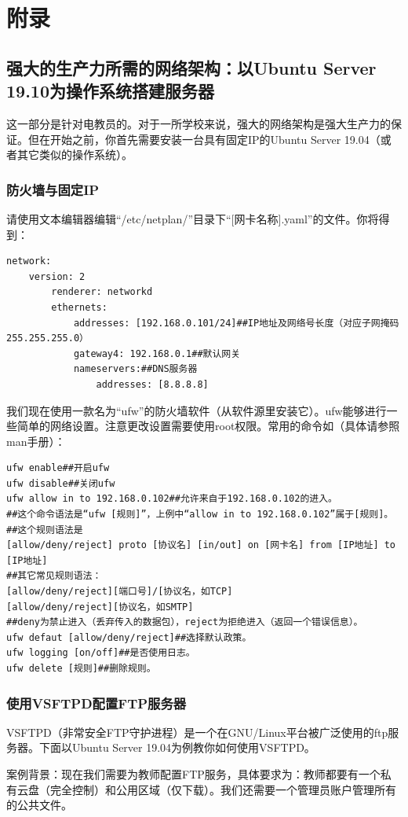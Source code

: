 \chapter{附录}
\section{强大的生产力所需的网络架构：以Ubuntu Server 19.10为操作系统搭建服务器}
这一部分是针对电教员的。对于一所学校来说，强大的网络架构是强大生产力的保证。但在开始之前，你首先需要安装一台具有固定IP的Ubuntu Server 19.04（或者其它类似的操作系统）。
\subsection{防火墙与固定IP}
请使用文本编辑器编辑“/etc/netplan/”目录下“[网卡名称].yaml”的文件。你将得到：
\begin{verbatim}
network:
	version: 2
		renderer: networkd
		ethernets:
			addresses: [192.168.0.101/24]##IP地址及网络号长度（对应子网掩码255.255.255.0）
			gateway4: 192.168.0.1##默认网关
			nameservers:##DNS服务器
		    	addresses: [8.8.8.8]
\end{verbatim}\par
我们现在使用一款名为“ufw”的防火墙软件（从软件源里安装它）。ufw能够进行一些简单的网络设置。注意更改设置需要使用root权限。常用的命令如（具体请参照man手册）：
\begin{verbatim}
ufw enable##开启ufw
ufw disable##关闭ufw
ufw allow in to 192.168.0.102##允许来自于192.168.0.102的进入。
##这个命令语法是“ufw [规则]”，上例中“allow in to 192.168.0.102”属于[规则]。
##这个规则语法是
[allow/deny/reject] proto [协议名] [in/out] on [网卡名] from [IP地址] to [IP地址]
##其它常见规则语法：
[allow/deny/reject][端口号]/[协议名，如TCP]
[allow/deny/reject][协议名，如SMTP]
##deny为禁止进入（丢弃传入的数据包），reject为拒绝进入（返回一个错误信息）。
ufw defaut [allow/deny/reject]##选择默认政策。
ufw logging [on/off]##是否使用日志。
ufw delete [规则]##删除规则。
\end{verbatim}
\subsection{使用VSFTPD配置FTP服务器}
VSFTPD（非常安全FTP守护进程）是一个在GNU/Linux平台被广泛使用的ftp服务器。下面以Ubuntu Server 19.04为例教你如何使用VSFTPD。\par
案例背景：现在我们需要为教师配置FTP服务，具体要求为：教师都要有一个私有云盘（完全控制）和公用区域（仅下载）。我们还需要一个管理员账户管理所有的公共文件。
